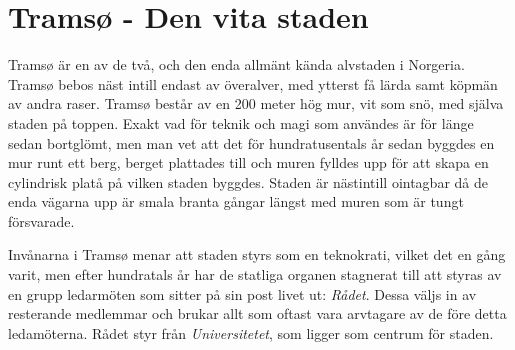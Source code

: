 \chapter*{Tramsø - Den vita staden}
%
Tramsø är en av de två, och den enda allmänt kända alvstaden i Norgeria. Tramsø bebos näst intill endast av överalver, med ytterst få lärda samt köpmän av andra raser. Tramsø består av en 200 meter hög mur, vit som snö, med själva staden på toppen. Exakt vad för teknik och magi som användes är för länge sedan bortglömt, men man vet att det för hundratusentals år sedan byggdes en mur runt ett berg, berget plattades till och muren fylldes upp för att skapa en cylindrisk platå på vilken staden byggdes. Staden är nästintill ointagbar då de enda vägarna upp är smala branta gångar längst med muren som är tungt försvarade.

Invånarna i Tramsø menar att staden styrs som en teknokrati, vilket det en gång varit, men efter hundratals år har de statliga organen stagnerat till att styras av en grupp ledarmöten som sitter på sin post livet ut: \textit{Rådet}. Dessa väljs in av resterande medlemmar och brukar allt som oftast vara arvtagare av de före detta ledamöterna. Rådet styr från \textit{Universitetet}, som ligger som centrum för staden.
